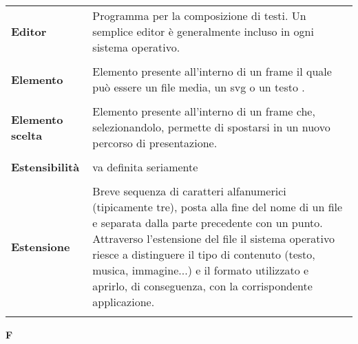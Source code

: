 \begin{longtable}{L{4cm} p{10cm}}
\textbf{Editor} & Programma per la composizione di testi. Un semplice editor è generalmente incluso in ogni sistema operativo. \\ 
 \\ 
\textbf{Elemento} & Elemento presente all'interno di un frame il quale può essere un file media, un svg o un testo . \\ 
 \\ 
\textbf{Elemento scelta} & Elemento presente all'interno di un frame che, selezionandolo, permette di spostarsi in un nuovo percorso di presentazione. \\ 
 \\ 
\textbf{Estensibilità} & va definita seriamente \\ 
 \\ 
\textbf{Estensione} & Breve sequenza di caratteri alfanumerici (tipicamente tre), posta alla fine del nome di un file e separata dalla parte precedente con un punto. Attraverso l’estensione del file il sistema operativo riesce a distinguere il tipo di contenuto (testo, musica, immagine...) e il formato utilizzato e aprirlo, di conseguenza, con la corrispondente applicazione. \\ 
 \\ 
\end{longtable} 
\newpage 
{} 
{} 
\hfill\Huge{\textbf{F}} \\ 
\normalsize 
